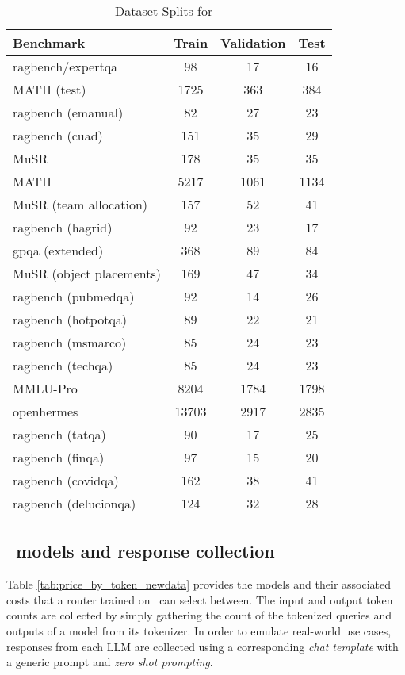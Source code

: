 \begin{table}
    \centering
    \begin{tabular}{lccc}
        \toprule
        \textbf{Benchmark} & \textbf{Train} & \textbf{Validation} & \textbf{Test} \\
        \midrule
        ragbench/expertqa & 98 & 17 & 16 \\
        MATH (test) & 1725 & 363 & 384 \\
        ragbench (emanual) & 82 & 27 & 23 \\
        ragbench (cuad) & 151 & 35 & 29 \\
        MuSR & 178 & 35 & 35 \\
        MATH & 5217 & 1061 & 1134 \\
        MuSR (team allocation) & 157 & 52 & 41 \\
        ragbench (hagrid) & 92 & 23 & 17 \\
        gpqa (extended) & 368 & 89 & 84 \\
        MuSR (object placements) & 169 & 47 & 34 \\
        ragbench (pubmedqa) & 92 & 14 & 26 \\
        ragbench (hotpotqa) & 89 & 22 & 21 \\
        ragbench (msmarco) & 85 & 24 & 23 \\
        ragbench (techqa) & 85 & 24 & 23 \\
        MMLU-Pro & 8204 & 1784 & 1798 \\
        openhermes & 13703 & 2917 & 2835 \\
        ragbench (tatqa) & 90 & 17 & 25 \\
        ragbench (finqa) & 97 & 15 & 20 \\
        ragbench (covidqa) & 162 & 38 & 41 \\
        ragbench (delucionqa) & 124 & 32 & 28 \\
        \bottomrule
    \end{tabular}
    \caption{Dataset Splits for \newdata\ }
    \label{tab:dataset_splits}
\end{table}

\subsection{\newdata\ models and response collection}
\label{sec: sprout collection}
Table \ref{tab:price_by_token_newdata} provides the models and their associated costs that a router trained on \newdata\ can select between. The input and output token counts are collected by simply gathering the count of the tokenized queries and outputs of a model from its tokenizer. In order to emulate real-world use cases, responses from each LLM are collected using a corresponding \emph{chat template} with a generic prompt and \emph{zero shot prompting}.


